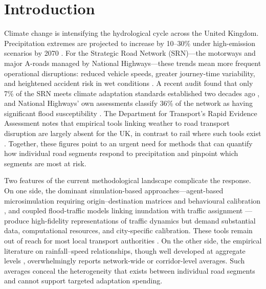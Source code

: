 \documentclass[review]{elsarticle}
\begin{document}
\section{Introduction}
\label{sec:intro}

Climate change is intensifying the hydrological cycle across the United Kingdom. Precipitation extremes are projected to increase by 10--30\% under high-emission scenarios by 2070 \citep{ukcp18,stern2007contribution,koetse2009impact}. For the Strategic Road Network (SRN)---the motorways and major A-roads managed by National Highways---these trends mean more frequent operational disruptions: reduced vehicle speeds, greater journey-time variability, and heightened accident risk in wet conditions \citep{hranac2006empirical,maze2006weather,elfaouzi2012effects}. A recent audit found that only 7\% of the SRN meets climate adaptation standards established two decades ago \citep{nce2026srn}, and National Highways' own assessments classify 36\% of the network as having significant flood susceptibility \citep{nh2024climate}. The Department for Transport's Rapid Evidence Assessment notes that empirical tools linking weather to road transport disruption are largely absent for the UK, in contrast to rail where such tools exist \citep{dft2024rea}. Together, these figures point to an urgent need for methods that can quantify how individual road segments respond to precipitation and pinpoint which segments are most at risk.

Two features of the current methodological landscape complicate the response. On one side, the dominant simulation-based approaches---agent-based microsimulation requiring origin--destination matrices and behavioural calibration \citep{huang2022overview,he2026flood}, and coupled flood-traffic models linking inundation with traffic assignment \citep{pregnolato2017depth,pregnolato2016impact,farahmand2024integrating}---produce high-fidelity representations of traffic dynamics but demand substantial data, computational resources, and city-specific calibration. These tools remain out of reach for most local transport authorities \citep{unece2024stress}. On the other side, the empirical literature on rainfall--speed relationships, though well developed at aggregate levels \citep{hranac2006empirical,becker2026rainfall,bi2022weather,cai2016rainfall,koetse2009impact}, overwhelmingly reports network-wide or corridor-level averages. Such averages conceal the heterogeneity that exists between individual road segments and cannot support targeted adaptation spending.
\end{document}

